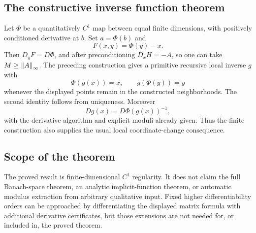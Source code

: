 \subsection{The constructive inverse function theorem}

Let \(\Phi\) be a quantitatively \(C^1\) map between equal
finite dimensions, with positively conditioned derivative at
\(b\). Set \(a=\Phi(b)\) and
\[
 F(x,y)=\Phi(y)-x.
\]
Then \(D_yF=D\Phi\), and after preconditioning
\(D_xH=-A\), so one can take \(M\ge\left\lVert A\right\rVert_\infty\).
The preceding construction gives a primitive recursive local
inverse \(g\) with
\[
 \Phi(g(x))=x,\qquad
 g(\Phi(y))=y
\]
whenever the displayed points remain in the constructed
neighborhoods. The second identity follows from uniqueness.
Moreover
\[
 Dg(x)=D\Phi(g(x))^{-1},
\]
with the derivative algorithm and explicit moduli already given.
Thus the finite construction also supplies the usual local
coordinate-change consequence.

\subsection{Scope of the theorem}

The proved result is finite-dimensional \(C^1\) regularity.
It does not claim the full Banach-space theorem, an analytic
implicit-function theorem, or automatic modulus extraction
from arbitrary qualitative input. Fixed higher differentiability
orders can be approached by differentiating the displayed
matrix formula with additional derivative certificates, but
those extensions are not needed for, or included in, the
proved theorem.

